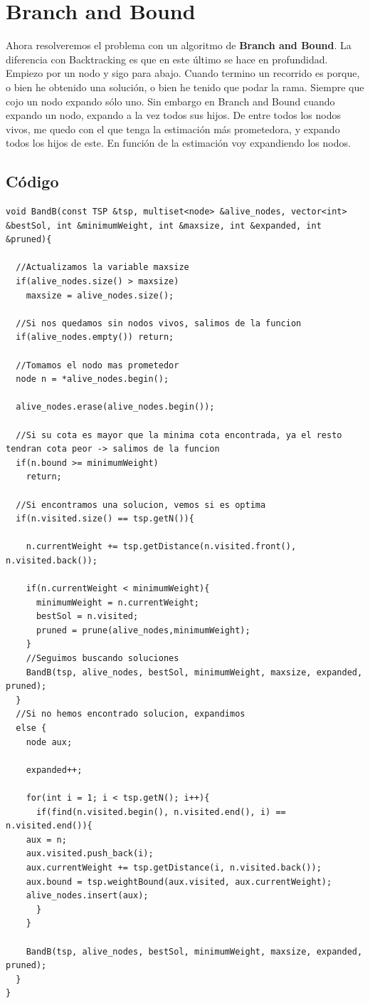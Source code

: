 \documentclass[a4]{article}
\begin{document}
\section{Branch and Bound}

Ahora resolveremos el problema con un algoritmo de \textbf{Branch and Bound}. La diferencia con Backtracking es que en este último se hace en
profundidad. Empiezo por un nodo y sigo para abajo. Cuando termino un recorrido es porque, o bien he obtenido una solución, o bien he tenido que podar la rama. Siempre que cojo un nodo expando sólo uno.
Sin embargo en Branch and Bound cuando expando un nodo, expando a la vez todos sus hijos. De entre todos los nodos vivos, me quedo con el que tenga la estimación más prometedora, y expando todos los hijos de este. En función de la estimación voy expandiendo los nodos.

\subsection{Código}

\begin{lstlisting}
void BandB(const TSP &tsp, multiset<node> &alive_nodes, vector<int> &bestSol, int &minimumWeight, int &maxsize, int &expanded, int &pruned){

  //Actualizamos la variable maxsize
  if(alive_nodes.size() > maxsize)
    maxsize = alive_nodes.size();

  //Si nos quedamos sin nodos vivos, salimos de la funcion
  if(alive_nodes.empty()) return;

  //Tomamos el nodo mas prometedor
  node n = *alive_nodes.begin();

  alive_nodes.erase(alive_nodes.begin());

  //Si su cota es mayor que la minima cota encontrada, ya el resto tendran cota peor -> salimos de la funcion
  if(n.bound >= minimumWeight)
    return;

  //Si encontramos una solucion, vemos si es optima
  if(n.visited.size() == tsp.getN()){
 
    n.currentWeight += tsp.getDistance(n.visited.front(), n.visited.back());

    if(n.currentWeight < minimumWeight){
      minimumWeight = n.currentWeight;
      bestSol = n.visited;
      pruned = prune(alive_nodes,minimumWeight);
    }
    //Seguimos buscando soluciones
    BandB(tsp, alive_nodes, bestSol, minimumWeight, maxsize, expanded, pruned);
  }
  //Si no hemos encontrado solucion, expandimos
  else { 
    node aux;

    expanded++;
  
    for(int i = 1; i < tsp.getN(); i++){
      if(find(n.visited.begin(), n.visited.end(), i) == n.visited.end()){
	aux = n;
	aux.visited.push_back(i);
	aux.currentWeight += tsp.getDistance(i, n.visited.back());
	aux.bound = tsp.weightBound(aux.visited, aux.currentWeight);
	alive_nodes.insert(aux);
      }
    }

    BandB(tsp, alive_nodes, bestSol, minimumWeight, maxsize, expanded, pruned);
  }
}

\end{lstlisting}
\end{document}
